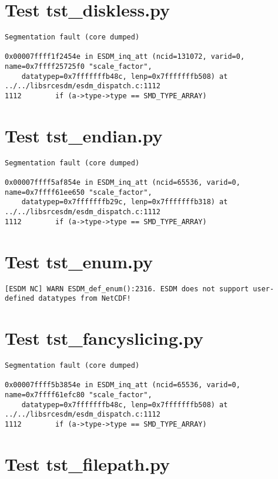 \section{Test tst\_diskless.py}

\begin{verbatim}
Segmentation fault (core dumped)

0x00007ffff1f2454e in ESDM_inq_att (ncid=131072, varid=0, name=0x7ffff25725f0 "scale_factor",
    datatypep=0x7fffffffb48c, lenp=0x7fffffffb508) at ../../libsrcesdm/esdm_dispatch.c:1112
1112	    if (a->type->type == SMD_TYPE_ARRAY)
\end{verbatim}

\section{Test tst\_endian.py}

\begin{verbatim}
Segmentation fault (core dumped)

0x00007ffff5af854e in ESDM_inq_att (ncid=65536, varid=0, name=0x7ffff61ee650 "scale_factor",
    datatypep=0x7fffffffb29c, lenp=0x7fffffffb318) at ../../libsrcesdm/esdm_dispatch.c:1112
1112	    if (a->type->type == SMD_TYPE_ARRAY)
\end{verbatim}

\section{Test tst\_enum.py}

\begin{verbatim}
[ESDM NC] WARN ESDM_def_enum():2316. ESDM does not support user-defined datatypes from NetCDF!
\end{verbatim}

\section{Test tst\_fancyslicing.py}

\begin{verbatim}
Segmentation fault (core dumped)

0x00007ffff5b3854e in ESDM_inq_att (ncid=65536, varid=0, name=0x7ffff61efc80 "scale_factor",
    datatypep=0x7fffffffb48c, lenp=0x7fffffffb508) at ../../libsrcesdm/esdm_dispatch.c:1112
1112	    if (a->type->type == SMD_TYPE_ARRAY)
\end{verbatim}

\section{Test tst\_filepath.py}


